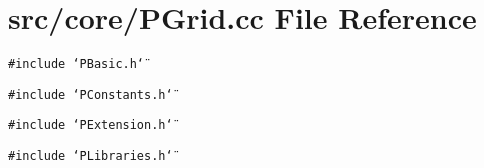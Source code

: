 \section{src/core/PGrid.cc File Reference}
\label{PGrid_8cc}


{\tt \#include \char`\"{}PBasic.h\char`\"{}}\par
{\tt \#include \char`\"{}PConstants.h\char`\"{}}\par
{\tt \#include \char`\"{}PExtension.h\char`\"{}}\par
{\tt \#include \char`\"{}PLibraries.h\char`\"{}}\par
